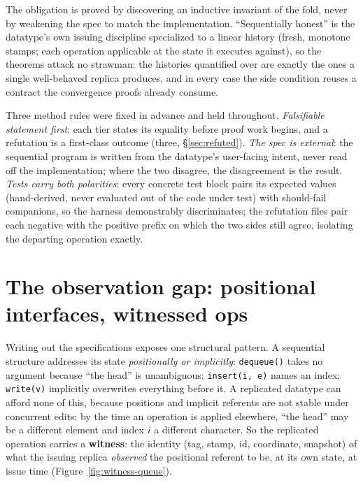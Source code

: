\documentclass[11pt]{article}
\newcommand{\code}[1]{\texttt{#1}}
\begin{document}
\noindent The obligation is proved by discovering an inductive
invariant of the fold, never by weakening the spec to match the
implementation. ``Sequentially honest'' is the datatype's own issuing
discipline specialized to a linear history (fresh, monotone stamps;
each operation applicable at the state it executes against), so the
theorems attack no strawman: the histories quantified over are
exactly the ones a single well-behaved replica produces, and in every
case the side condition reuses a contract the convergence proofs
already consume.

Three method rules were fixed in advance and held throughout.
\emph{Falsifiable statement first}: each tier states its equality
before proof work begins, and a refutation is a first-class outcome
(three, \S\ref{sec:refuted}). \emph{The spec is external}: the
sequential program is written from the datatype's user-facing intent,
never read off the implementation; where the two disagree, the
disagreement is the result. \emph{Tests carry both polarities}: every
concrete test block pairs its expected values (hand-derived, never
evaluated out of the code under test) with should-fail companions, so
the harness demonstrably discriminates; the refutation files pair each
negative with the positive prefix on which the two sides still agree,
isolating the departing operation exactly.

\section{The observation gap: positional interfaces, witnessed ops}
\label{sec:witness}

Writing out the specifications exposes one structural pattern. A sequential structure
addresses its state \emph{positionally or implicitly}:
\code{dequeue()} takes no argument because ``the head'' is
unambiguous; \code{insert(i, e)} names an index; \code{write(v)}
implicitly overwrites everything before it. A replicated datatype can
afford none of this, because positions and implicit referents are not
stable under concurrent edits: by the time an operation is applied
elsewhere, ``the head'' may be a different element and index $i$ a
different character. So the replicated operation carries a
\textbf{witness}: the identity (tag, stamp, id, coordinate, snapshot)
of what the issuing replica \emph{observed} the positional referent to
be, at its own state, at issue time (Figure~\ref{fig:witness-queue}).
\end{document}
